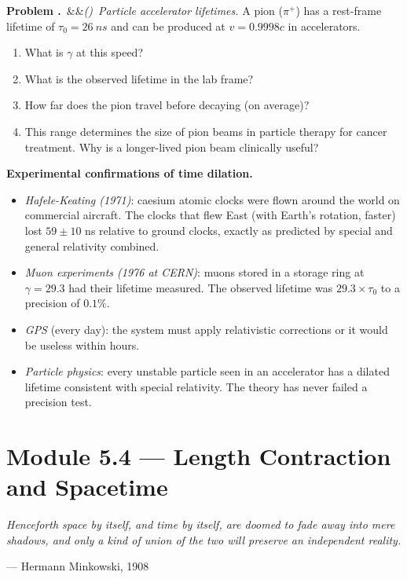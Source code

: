 \documentclass[12pt, a4paper, twoside]{book}
\newcounter{problem}[chapter]
\newcommand{\problem}[1][]{\refstepcounter{problem}\medskip\noindent
  \textcolor{accent}{\textbf{Problem \theproblem.}}\ \ifx&#1&\else\textit{(#1)}\ \fi}
\begin{document}
\begin{explobox}
\problem \textit{Particle accelerator lifetimes.} A pion ($\pi^+$) has a rest-frame lifetime of $\tau_0 = \SI{26}{ns}$ and can be produced at $v = 0.9998c$ in accelerators.
\begin{enumerate}[label=(\alph*)]
  \item What is $\gamma$ at this speed?
  \item What is the observed lifetime in the lab frame?
  \item How far does the pion travel before decaying (on average)?
  \item This range determines the size of pion beams in particle therapy for cancer treatment. Why is a longer-lived pion beam clinically useful?
\end{enumerate}
\end{explobox}

\begin{realworldbox}
\textbf{Experimental confirmations of time dilation.}
\begin{itemize}[leftmargin=1.5em,itemsep=3pt]
  \item \textit{Hafele-Keating (1971)}: caesium atomic clocks were flown around the world on commercial aircraft. The clocks that flew East (with Earth's rotation, faster) lost $59 \pm 10$ ns relative to ground clocks, exactly as predicted by special and general relativity combined.
  \item \textit{Muon experiments (1976 at CERN)}: muons stored in a storage ring at $\gamma = 29.3$ had their lifetime measured. The observed lifetime was $29.3 \times \tau_0$ to a precision of $0.1\%$.
  \item \textit{GPS} (every day): the system must apply relativistic corrections or it would be useless within hours.
  \item \textit{Particle physics}: every unstable particle seen in an accelerator has a dilated lifetime consistent with special relativity. The theory has never failed a precision test.
\end{itemize}
\end{realworldbox}

\section{Module 5.4 — Length Contraction and Spacetime}
\label{sec:spacetime}

\epigraph{\itshape
  Henceforth space by itself, and time by itself, are doomed to fade away
  into mere shadows, and only a kind of union of the two will preserve
  an independent reality.
}{--- Hermann Minkowski, 1908}
\end{document}
